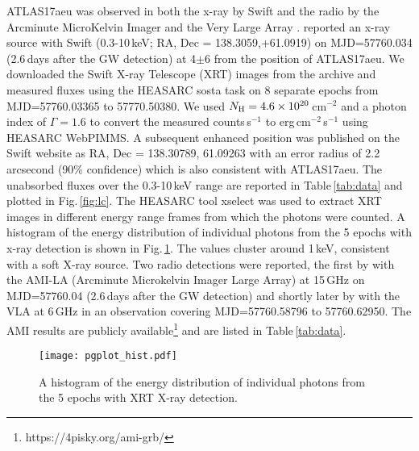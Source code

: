 \documentclass[twocolumn]{aastex61}
\def\ergcm2s{erg\,cm$^{-2}$\,s$^{-1}$}
\begin{document}
ATLAS17aeu was observed in both the x-ray by Swift \citep{GCN20390}
and the radio by the Arcminute MicroKelvin Imager \cite[AMI;][]{GCN20425} and the Very Large Array 
\citep[VLA][]{GCN20396}. 
\cite{GCN20390} reported an x-ray 
source with Swift (0.3-10\,keV; RA, Dec = 138.3059,+61.0919) on MJD=57760.034 (2.6\,days after the GW detection)
at 4$\pm$6 from the position of ATLAS17aeu. We downloaded the Swift X-ray Telescope (XRT) 
images from the archive and measured fluxes using the HEASARC sosta task on 8 separate epochs from 
MJD=57760.03365 to 57770.50380. We used  $N_{\rm H}=4.6\times10^{20}$\,cm$^{-2}$ and a photon index of $\Gamma=1.6$ 
\citep[as in][]{GCN20415} to convert the measured counts\,s$^{-1}$ to \ergcm2s using HEASARC WebPIMMS.  A subsequent enhanced position was published on the Swift website as RA, Dec = 138.30789, 61.09263 with an error radius of 2.2 arcsecond (90\% confidence) which is also consistent with ATLAS17aeu.
The unabsorbed fluxes over the 0.3-10\,keV range are reported in Table\,\ref{tab:data}
and plotted in Fig.\,\ref{fig:lc}.
 The HEASARC tool xselect was used to extract XRT images in different energy range frames from which the photons were counted. A histogram of the energy distribution of individual photons from the 5 epochs with x-ray detection is shown in Fig.\,\ref{fig:xrt}. The values cluster around 1\,keV, consistent with a soft X-ray source. 
Two radio detections were  reported, the first by \cite{GCN20425} with the AMI-LA 
(Arcminute Microkelvin Imager Large Array)
at 15\,GHz 
on MJD=57760.04 (2.6\,days after the GW detection) 
and shortly later by 
\cite{GCN20396} with the VLA at 6\,GHz 
in an observation covering MJD=57760.58796 to 57760.62950.  
The AMI results are publicly available\footnote{https://4pisky.org/ami-grb/} and 
are listed in Table\,\ref{tab:data}. 

\begin{figure}
\texttt{[image: pgplot\_hist.pdf]}
\caption{A histogram of the energy distribution of individual photons from the 5 epochs with XRT X-ray detection.}
\label{fig:xrt}
\end{figure}
\end{document}
